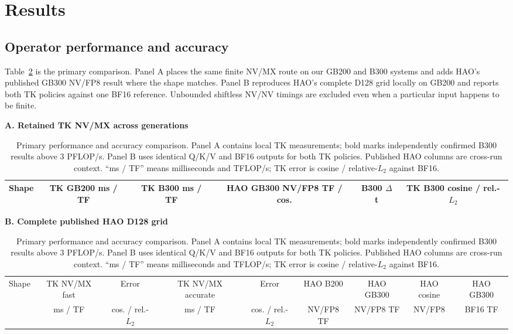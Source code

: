 \section{Results}

\subsection{Operator performance and accuracy}

Table~\ref{tab:primary-results} is the primary comparison. Panel A places the
same finite NV/MX route on our GB200 and B300 systems and adds HAO's published
GB300 NV/FP8 result where the shape matches. Panel B reproduces HAO's complete
D128 grid locally on GB200 and reports both TK policies against one BF16
reference. Unbounded shiftless NV/NV timings are excluded even when a
particular input happens to be finite.

\begin{table}[htbp]
\centering
\caption{Primary performance and accuracy comparison. Panel A contains local
TK measurements; bold marks independently confirmed B300 results above
3 PFLOP/s. Panel B uses identical Q/K/V and BF16 outputs for both TK policies.
Published HAO columns are cross-run context. ``ms / TF'' means milliseconds
and TFLOP/s; TK error is cosine / relative-$L_2$ against BF16.}
\label{tab:primary-results}
\begingroup
\scriptsize
\setlength{\tabcolsep}{3pt}
\renewcommand{\arraystretch}{0.92}

\textbf{A. Retained TK NV/MX across generations}\par\smallskip
\begin{adjustbox}{max width=\textwidth}
\begin{tabular}{lccccc}
\toprule
Shape & TK GB200 ms / TF & TK B300 ms / TF & HAO GB300 NV/FP8 TF / cos.
& B300 $\Delta$t & TK B300 cosine / rel.-$L_2$ \\
\midrule
%
\end{tabular}
\end{adjustbox}

\vspace{3pt}
\textbf{B. Complete published HAO D128 grid}\par\smallskip
\begin{adjustbox}{max width=\textwidth}
\begin{tabular}{lcccccccc}
\toprule
Shape & TK NV/MX fast & Error & TK NV/MX accurate & Error
& HAO B200 & HAO GB300 & HAO cosine & HAO GB300 \\
 & ms / TF & cos. / rel.-$L_2$ & ms / TF & cos. / rel.-$L_2$
& NV/FP8 TF & NV/FP8 TF & NV/FP8 & BF16 TF \\
\midrule
%
\end{tabular}
\end{adjustbox}
\endgroup
\end{table}

